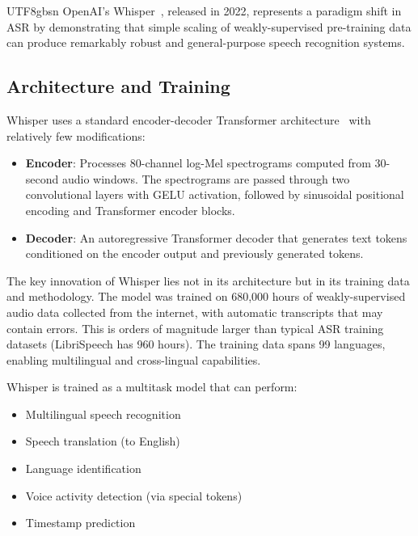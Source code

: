 \documentclass[12pt,a4paper]{article}
\begin{document}
\begin{CJK}{UTF8}{gbsn}
OpenAI's Whisper~\cite{radford2023robust}, released in 2022, represents a paradigm shift in ASR by demonstrating that simple scaling of weakly-supervised pre-training data can produce remarkably robust and general-purpose speech recognition systems.

\subsection{Architecture and Training}

Whisper uses a standard encoder-decoder Transformer architecture~\cite{vaswani2017attention} with relatively few modifications:
\begin{itemize}[leftmargin=*]
    \item \textbf{Encoder}: Processes 80-channel log-Mel spectrograms computed from 30-second audio windows. The spectrograms are passed through two convolutional layers with GELU activation, followed by sinusoidal positional encoding and Transformer encoder blocks.
    \item \textbf{Decoder}: An autoregressive Transformer decoder that generates text tokens conditioned on the encoder output and previously generated tokens.
\end{itemize}

The key innovation of Whisper lies not in its architecture but in its training data and methodology. The model was trained on 680,000 hours of weakly-supervised audio data collected from the internet, with automatic transcripts that may contain errors. This is orders of magnitude larger than typical ASR training datasets (LibriSpeech has 960 hours). The training data spans 99 languages, enabling multilingual and cross-lingual capabilities.

Whisper is trained as a multitask model that can perform:
\begin{itemize}[leftmargin=*]
    \item Multilingual speech recognition
    \item Speech translation (to English)
    \item Language identification
    \item Voice activity detection (via special tokens)
    \item Timestamp prediction
\end{itemize}


\end{CJK}
\end{document}
